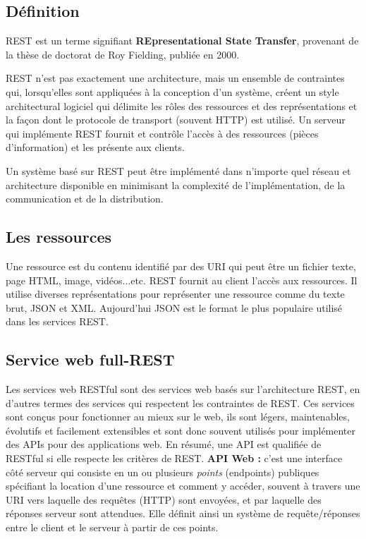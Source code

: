 \subsection{Définition}
REST est un terme signifiant \textbf{REpresentational State Transfer}, provenant de la thèse de doctorat de Roy Fielding, publiée en 2000.

REST n'est pas exactement une architecture, mais un ensemble de contraintes qui, lorsqu'elles sont appliquées à la conception d'un système, créent un style architectural logiciel qui délimite les rôles des ressources et des représentations et la façon dont le protocole de transport (souvent HTTP) est utilisé. 
Un serveur qui implémente REST fournit et contrôle l'accès à des ressources (pièces d'information) et les présente aux clients.
			
Un système basé sur REST peut être implémenté dans n'importe quel réseau et architecture disponible en minimisant la complexité de l'implémentation, de la communication et de la distribution\cite{richardson2008restful}.

\subsection{Les ressources}
Une ressource est du contenu identifié par des URI  qui peut être un fichier texte, page HTML, image, vidéos...etc.
REST fournit au client l'accès aux ressources. Il utilise diverses représentations pour représenter une ressource comme du texte brut, JSON et XML. Aujourd'hui JSON est le format le plus populaire utilisé dans les services REST.

\subsection{Service web full-REST}
Les services web RESTful sont des services web basés sur l'architecture REST, en d'autres termes des services qui respectent les contraintes de REST.
Ces services sont conçus pour fonctionner au mieux sur le web, ils sont légers, maintenables, évolutifs et facilement extensibles et sont donc souvent utilisés pour implémenter des APIs pour des applications web.\cite{refTutorialPointsREST}
\newline 
En résumé, une API est qualifiée de RESTful si elle respecte les critères de REST.
\newline
\newline
\textbf{API Web :} c'est une interface côté serveur qui consiste en un ou plusieurs \emph{points} (endpoints) publiques spécifiant la location d'une ressource et comment y accéder, souvent à travers une URI vers laquelle des requêtes (HTTP) sont envoyées, et par laquelle des réponses serveur sont attendues.
Elle définit ainsi un système de requête/réponses entre le client et le serveur à partir de ces points.

